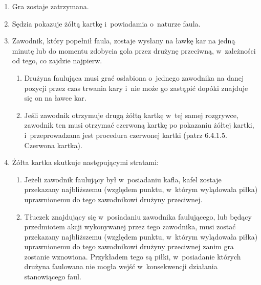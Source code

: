 \documentclass[12pt]{article}
\begin{document}
\begin{enumerate}
	\item
	      Gra zostaje zatrzymana.
	\item
	      Sędzia pokazuje żółtą kartkę i~powiadamia o~naturze faula.
	\item
	      Zawodnik, który popełnił faula, zostaje wysłany na ławkę kar na jedną
	      minutę lub do momentu zdobycia gola przez drużynę przeciwną, w~zależności od tego, co zajdzie najpierw.

	      \begin{enumerate}
		      \item
		            Drużyna faulująca musi grać osłabiona o~jednego zawodnika na danej
		            pozycji przez czas trwania kary i~nie może go zastąpić dopóki
		            znajduje się on na ławce kar.
		      \item
		            Jeśli zawodnik otrzymuje drugą żółtą kartkę w~tej samej rozgrywce,
		            zawodnik ten musi otrzymać czerwoną kartkę po pokazaniu żółtej
		            kartki, i~przeprowadzana jest procedura czerwonej kartki (patrz
		            6.4.1.5. Czerwona kartka).
	      \end{enumerate}
	\item
	      Żółta kartka skutkuje następującymi stratami:

	      \begin{enumerate}
		      \item
		            Jeżeli zawodnik faulujący był w~posiadaniu kafla, kafel zostaje
		            przekazany najbliższemu (względem punktu, w~którym wylądowała piłka)
		            uprawnionemu do tego zawodnikowi drużyny przeciwnej.
		      \item
		            Tłuczek znajdujący się w~posiadaniu zawodnika faulującego, lub
		            będący przedmiotem akcji wykonywanej przez tego zawodnika, musi
		            zostać przekazany najbliższemu (względem punktu, w~którym wylądowała
		            piłka) uprawnionemu do tego zawodnikowi drużyny przeciwnej zanim gra
		            zostanie wznowiona. Przykładem tego są piłki, w~posiadanie których
		            drużyna faulowana nie mogła wejść w~konsekwencji działania
		            stanowiącego faul.


\end{enumerate}
\end{enumerate}
\end{document}
